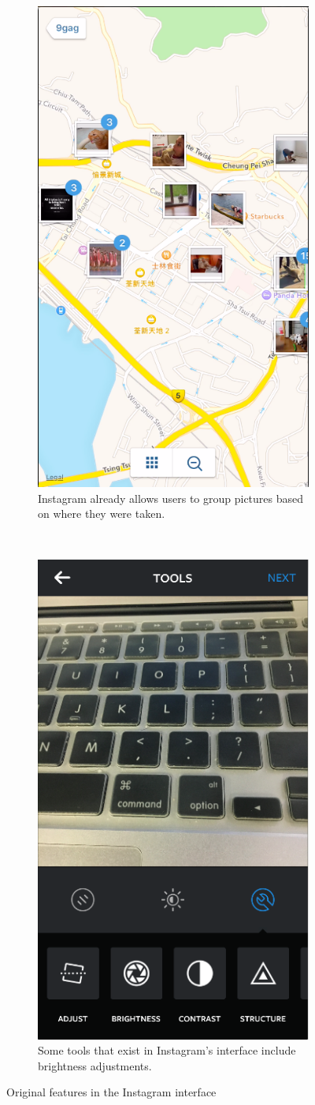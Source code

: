 \documentclass[11pt]{article}
\begin{document}
\begin{figure}
\centering
\begin{subfigure}[b]{.5\textwidth}
    \centering
    \includegraphics[height=\textwidth]{images/maps_with_pictures.png}
    \caption{Instagram already allows users to group pictures based on where they were taken.}
    \label{instagram_pictures}
\end{subfigure}%
~~~~~~~
\begin{subfigure}[b]{.5\textwidth}
    \centering
    \includegraphics[height=\textwidth]{images/instagram_tools.png}
    \caption{Some tools that exist in Instagram's interface include brightness adjustments.}
    \label{tools}
    \end{subfigure}
\caption{Original features in the Instagram interface}
\end{figure}
\end{document}
